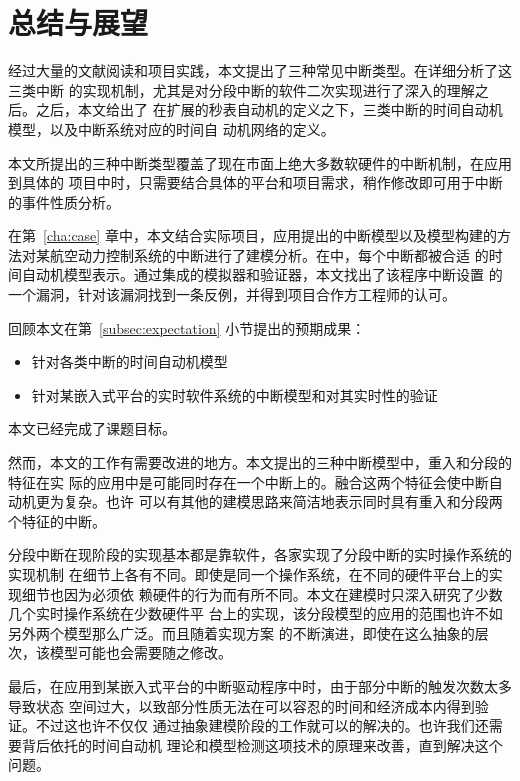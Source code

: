 
\chapter{总结与展望}
\label{cha:sum}

经过大量的文献阅读和项目实践，本文提出了三种常见中断类型。在详细分析了这三类中断
的实现机制，尤其是对分段中断的软件二次实现进行了深入的理解之后。之后，本文给出了
在扩展的秒表自动机的定义之下，三类中断的时间自动机模型，以及中断系统对应的时间自
动机网络的定义。

本文所提出的三种中断类型覆盖了现在市面上绝大多数软硬件的中断机制，在应用到具体的
项目中时，只需要结合具体的平台和项目需求，稍作修改即可用于中断的事件性质分析。

在第~\ref{cha:case} 章中，本文结合实际项目，应用提出的中断模型以及模型构建的方
法对某航空动力控制系统的中断进行了建模分析。在\uppaal 中，每个中断都被合适
的时间自动机模型表示。通过\uppaal 集成的模拟器和验证器，本文找出了该程序中断设置
的一个漏洞，针对该漏洞找到一条反例，并得到项目合作方工程师的认可。

回顾本文在第~\ref{subsec:expectation} 小节提出的预期成果：

\begin{itemize}
	\item 针对各类中断的时间自动机模型
	\item 针对某嵌入式平台的实时软件系统的中断模型和对其实时性的验证
\end{itemize}

本文已经完成了课题目标。

然而，本文的工作有需要改进的地方。本文提出的三种中断模型中，重入和分段的特征在实
际的应用中是可能同时存在一个中断上的。融合这两个特征会使中断自动机更为复杂。也许
可以有其他的建模思路来简洁地表示同时具有重入和分段两个特征的中断。

分段中断在现阶段的实现基本都是靠软件，各家实现了分段中断的实时操作系统的实现机制
在细节上各有不同。即使是同一个操作系统，在不同的硬件平台上的实现细节也因为必须依
赖硬件的行为而有所不同。本文在建模时只深入研究了少数几个实时操作系统在少数硬件平
台上的实现，该分段模型的应用的范围也许不如另外两个模型那么广泛。而且随着实现方案
的不断演进，即使在这么抽象的层次，该模型可能也会需要随之修改。

最后，在应用到某嵌入式平台的中断驱动程序中时，由于部分中断的触发次数太多导致状态
空间过大，以致部分性质无法在可以容忍的时间和经济成本内得到验证。不过这也许不仅仅
通过抽象建模阶段的工作就可以的解决的。也许我们还需要\uppaal 背后依托的时间自动机
理论和模型检测这项技术的原理来改善，直到解决这个问题。

